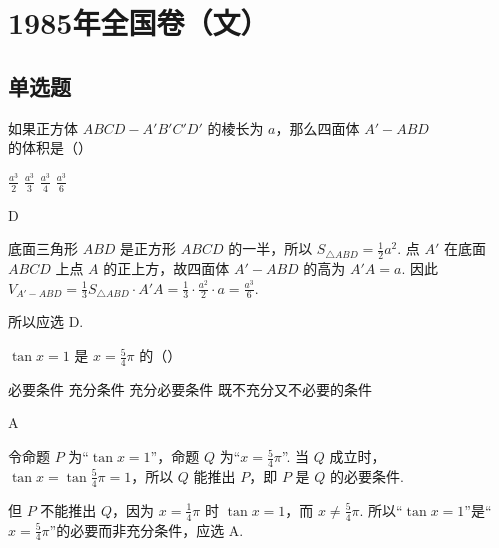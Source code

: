 \documentclass[UTF8,a4paper,oneside,11pt]{ctexbook}
\begin{document}
\mainmatter

\chapter{1985年全国卷（文）}

\section{单选题}

\begin{problem}

如果正方体 \(ABCD - A'B'C'D'\) 的棱长为 \(a\)，那么四面体 \(A' - ABD\) 的体积是（\quad）

\choices
    {\(\frac{a^3}{2}\)}
    {\(\frac{a^3}{3}\)}
    {\(\frac{a^3}{4}\)}
    {\(\frac{a^3}{6}\)}

\begin{answer}
D
\end{answer}

\begin{solution}
底面三角形 \(ABD\) 是正方形 \(ABCD\) 的一半，所以
\(S_{\triangle ABD}=\frac{1}{2}a^2\). 点 \(A'\) 在底面 \(ABCD\) 上点 \(A\) 的正上方，故四面体 \(A'-ABD\) 的高为 \(A'A=a\). 因此
\(V_{A'-ABD}=\frac{1}{3}S_{\triangle ABD}\cdot A'A=\frac{1}{3}\cdot\frac{a^2}{2}\cdot a=\frac{a^3}{6}\).

所以应选 D.
\end{solution}
\end{problem}

\begin{problem}

\(\tan x = 1\) 是 \(x = \frac{5}{4}\pi\) 的（\quad）

\choices
    {必要条件}
    {充分条件}
    {充分必要条件}
    {既不充分又不必要的条件}

\begin{answer}
A
\end{answer}

\begin{solution}
令命题 \(P\) 为“\(\tan x=1\)”，命题 \(Q\) 为“\(x=\frac{5}{4}\pi\)”. 当 \(Q\) 成立时，
\(\tan x=\tan\frac{5}{4}\pi=1\)，所以 \(Q\) 能推出 \(P\)，即 \(P\) 是 \(Q\) 的必要条件.

但 \(P\) 不能推出 \(Q\)，因为 \(x=\frac{1}{4}\pi\) 时 \(\tan x=1\)，而 \(x\ne\frac{5}{4}\pi\). 所以“\(\tan x=1\)”是“\(x=\frac{5}{4}\pi\)”的必要而非充分条件，应选 A.
\end{solution}
\end{problem}
\end{document}
